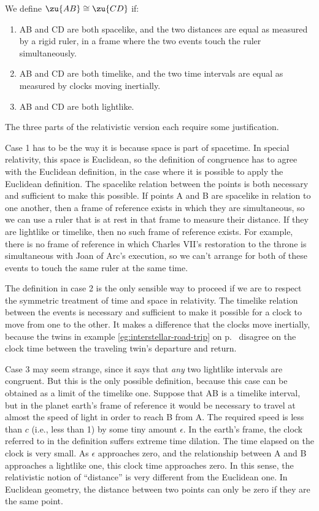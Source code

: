 \begin{lessimportant}
We define $\zu{AB}\cong \zu{CD}$ if:
\begin{enumerate}
\item AB and CD are both spacelike, and the two distances are equal as measured by a rigid ruler, in a frame
where the two events touch the ruler simultaneously.
\item AB and CD are both timelike, and the two time intervals are equal as measured by clocks moving inertially.
\item AB and CD are both lightlike.
\end{enumerate}
\end{lessimportant}

The three parts of the relativistic version each require some justification.

Case 1 has to be the way it is because
space is part of spacetime. In special relativity, this space is Euclidean, so the definition of congruence has
to agree with the Euclidean definition, in the case where it is possible to apply the Euclidean definition.
The spacelike relation between the points is both necessary and sufficient to make this possible.
If points A and B are spacelike in relation to one another, then a frame of reference exists in which
they are simultaneous, so we can use a ruler that is at rest in that frame to measure their distance.
If they are lightlike or timelike, then no such frame of reference exists. For example, there is no frame
of reference in which Charles VII's restoration to the throne is simultaneous with Joan of Arc's execution,
so we can't arrange for both of these events to touch the same ruler at the same time.

The definition in case 2 is the only sensible way to proceed if we are to respect the symmetric treatment of
time and space in relativity. The timelike relation between the events is necessary and sufficient to
make it possible for a clock to move from one to the other.
It makes a difference that the clocks move inertially, because the twins
in example \ref{eg:interstellar-road-trip} on p.~\pageref{eg:interstellar-road-trip} disagree on the clock time between the
traveling twin's departure and return.

Case 3 may seem strange, since it says that \emph{any} two lightlike intervals are congruent. But this is the only
possible definition, because this case can be obtained as a limit of the timelike one. Suppose that AB is a timelike interval,
but in the planet earth's frame of reference it would be necessary to travel at almost the speed of light in order
to reach B from A. The required speed is less than $c$ (i.e., less than 1) by some tiny amount $\epsilon$.
In the earth's frame, the clock referred to in the definition suffers extreme time dilation. The time elapsed
on the clock is very small. As $\epsilon$ approaches zero, and the relationship between A and B approaches a lightlike
one, this clock time approaches zero. In this sense, the relativistic notion of ``distance'' is very different from
the Euclidean one. In Euclidean geometry, the distance between two points can only be zero if they are the same
point.


